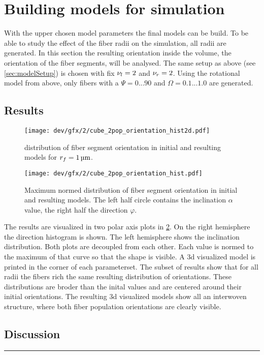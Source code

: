 \section{Building models for simulation}
% 
With the upper chosen model parameters the final models can be build.
To be able to study the effect of the fiber radii on the simulation, all radii are generated.
In this section the resulting orientation inside the volume, \ie{} the orientation of the fiber segments, will be analysed.
The same setup as above (see \cref{sec:modelSetup}) is chosen with fix $\textnormal{$\nu_{l}$}=\SI{2}{}$ and $\textnormal{$\nu_{r}$} = \SI{2}{}$.
Using the rotational model from above, only fibers with a $\Psi =  0...90$ and $\Omega = 0.1...1.0$ are generated.
% 
\subsection{Results}
% 
\begin{figure}[!t]
\centering
\texttt{[image: dev/gfx/2/cube\_2pop\_orientation\_hist2d.pdf]}
\caption[Model orientation histograms]{distribution of fiber segment orientation in initial and resulting models for $\fiberRadius = \SI{1}{\micro\meter}$. }
\label{fig:modelOrientation}
\end{figure}
% 
\begin{figure}[p]
\centering
\texttt{[image: dev/gfx/2/cube\_2pop\_orientation\_hist.pdf]}
\caption[Model orientation histograms]{Maximum normed distribution of fiber segment orientation in initial and resulting models. The left half circle contains the inclination $\alpha$ value, the right half the direction $\varphi$. }
\label{fig:modelOrientationHist1d}
\end{figure}
% 
The results are visualized in two polar axis plots in \cref{fig:modelOrientationHist1d}. On the right hemisphere the direction histogram is shown.
The left hemisphere shows the inclination distribution.
Both plots are decoupled from each other. 
Each value is normed to the maximum of that curve so that the shape is visible.
A 3d visualized model is printed in the corner of each parameterset.
% 
The subset of results show that for all radii the fibers rich the same resulting distribution of orientations. 
These distributions are broder than the inital values and are centered around their initial orientations.
The resulting 3d visualized models show all an interwoven structure, where both fiber population orientations are clearly visible. 
%  
\subsection{Discussion}
% 
\vspace{5pt}
\hrule
\vspace{6pt}
% 